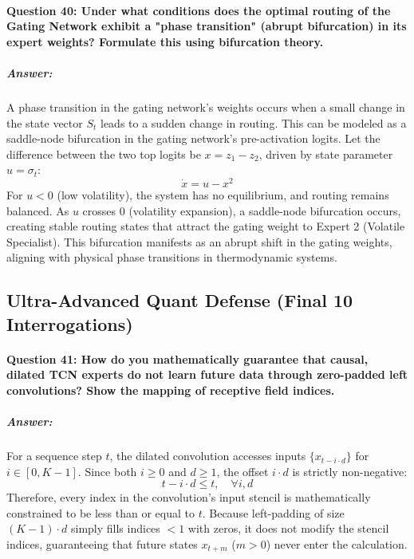 \documentclass[11pt,a4paper]{article}
\begin{document}
\paragraph{Question 40: Under what conditions does the optimal routing of the Gating Network exhibit a "phase transition" (abrupt bifurcation) in its expert weights? Formulate this using bifurcation theory.}
\subparagraph{Answer:}
A phase transition in the gating network's weights occurs when a small change in the state vector $S_t$ leads to a sudden change in routing. This can be modeled as a saddle-node bifurcation in the gating network's pre-activation logits. Let the difference between the two top logits be $x = z_1 - z_2$, driven by state parameter $u = \sigma_t$:
\begin{equation}
    \dot{x} = u - x^2
\end{equation}
For $u < 0$ (low volatility), the system has no equilibrium, and routing remains balanced. As $u$ crosses 0 (volatility expansion), a saddle-node bifurcation occurs, creating stable routing states that attract the gating weight to Expert 2 (Volatile Specialist). This bifurcation manifests as an abrupt shift in the gating weights, aligning with physical phase transitions in thermodynamic systems.

\subsection{Ultra-Advanced Quant Defense (Final 10 Interrogations)}

\paragraph{Question 41: How do you mathematically guarantee that causal, dilated TCN experts do not learn future data through zero-padded left convolutions? Show the mapping of receptive field indices.}
\subparagraph{Answer:}
For a sequence step $t$, the dilated convolution accesses inputs $\{x_{t - i \cdot d}\}$ for $i \in [0, K-1]$. Since both $i \geq 0$ and $d \geq 1$, the offset $i \cdot d$ is strictly non-negative:
\begin{equation}
    t - i \cdot d \leq t, \quad \forall i, d
\end{equation}
Therefore, every index in the convolution's input stencil is mathematically constrained to be less than or equal to $t$. Because left-padding of size $(K-1) \cdot d$ simply fills indices $< 1$ with zeros, it does not modify the stencil indices, guaranteeing that future states $x_{t+m}$ ($m > 0$) never enter the calculation.
\end{document}
